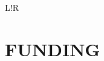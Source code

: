 \documentclass[letterpaper, onecolumn, 11pt]{article}
\newcommand\VRule{\color{lightgray}\vrule width 0.5pt}
\begin{document}
\begin{tabular}{L!{\VRule}R}
\end{tabular}


\section*{FUNDING}
\vspace{-0.3cm}
\end{document}
